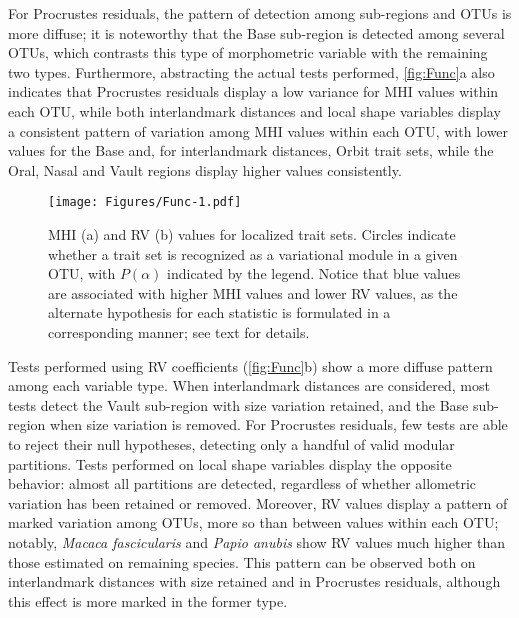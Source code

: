 \documentclass[12pt,twoside]{report}
\begin{document}
For Procrustes residuals, the pattern of detection among sub-regions and
OTUs is more diffuse; it is noteworthy that the Base sub-region is
detected among several OTUs, which contrasts this type of morphometric
variable with the remaining two types. Furthermore, abstracting the
actual tests performed, \autoref{fig:Func}a also indicates that
Procrustes residuals display a low variance for MHI values within each
OTU, while both interlandmark distances and local shape variables
display a consistent pattern of variation among MHI values within each
OTU, with lower values for the Base and, for interlandmark distances,
Orbit trait sets, while the Oral, Nasal and Vault regions display higher
values consistently.

\begin{figure}[htbp]
\centering
\texttt{[image: Figures/Func-1.pdf]}
\caption{MHI (a) and RV (b) values for localized trait sets. Circles
indicate whether a trait set is recognized as a variational module in a
given OTU, with $P(\alpha)$ indicated by the legend. Notice that blue
values are associated with higher MHI values and lower RV values, as the
alternate hypothesis for each statistic is formulated in a corresponding
manner; see text for details. \label{fig:Func}}
\end{figure}

Tests performed using RV coefficients (\autoref{fig:Func}b) show a more
diffuse pattern among each variable type. When interlandmark distances
are considered, most tests detect the Vault sub-region with size
variation retained, and the Base sub-region when size variation is
removed. For Procrustes residuals, few tests are able to reject their
null hypotheses, detecting only a handful of valid modular partitions.
Tests performed on local shape variables display the opposite behavior:
almost all partitions are detected, regardless of whether allometric
variation has been retained or removed. Moreover, RV values display a
pattern of marked variation among OTUs, more so than between values
within each OTU; notably, \emph{Macaca fascicularis} and \emph{Papio
anubis} show RV values much higher than those estimated on remaining
species. This pattern can be observed both on interlandmark distances
with size retained and in Procrustes residuals, although this effect is
more marked in the former type.
\end{document}

